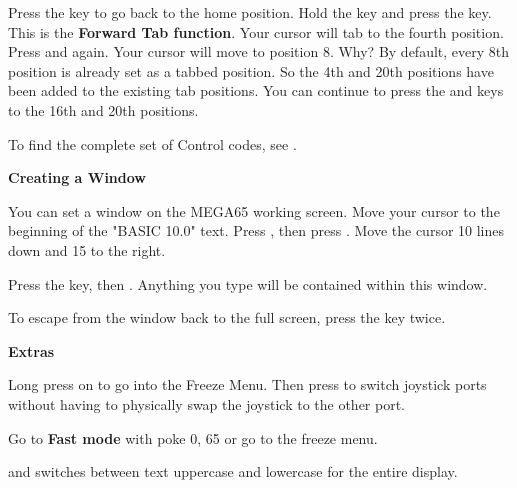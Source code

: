 Press the  key to go back to the home position. Hold the  key and press the  key. This is the \textbf{Forward Tab function}. Your cursor will tab to the fourth position. Press  and  again. Your cursor will move to position 8. Why? By default, every 8th position is already set as a tabbed position. So the 4th and 20th positions have been added to the existing tab positions. You can continue to press the  and  keys to the 16th and 20th positions.

To find the complete set of Control codes, see .


\newpage



\textbf{Creating a Window}

You can set a window on the MEGA65 working screen. Move your cursor to the beginning of the "BASIC 10.0" text. Press , then press . Move the cursor 10 lines down and 15 to the right.

Press the  key, then . Anything you type will be contained within this window.

To escape from the window back to the full screen, press the  key twice.


\textbf{Extras}

Long press on  to go into the Freeze Menu.  Then press  to switch joystick ports without having to physically swap the joystick to the other port.

Go to \textbf{Fast mode} with poke 0, 65 or go to the freeze menu.

 and  switches between text uppercase and lowercase for the entire display.
